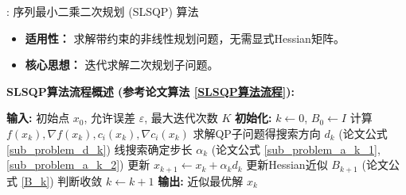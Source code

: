 \documentclass[9pt]{beamer}
\begin{document}
\begin{frame}{\insertsectionhead: 序列最小二乘二次规划 (SLSQP) 算法}
    \begin{itemize}
        \item \textbf{适用性：} 求解带约束的非线性规划问题，无需显式Hessian矩阵。
        \item \textbf{核心思想：} 迭代求解二次规划子问题。
    \end{itemize}
    \textbf{SLSQP算法流程概述 (参考论文算法 \ref{SLSQP算法流程}):}
    \begin{algorithmic}[1]
        \State \textbf{输入:} 初始点 $x_0$, 允许误差 $\varepsilon$, 最大迭代次数 $K$
        \State \textbf{初始化:} $k \leftarrow 0$, $B_0 \leftarrow I$
            \State 计算 $f(x_k), \nabla f(x_k), c_i(x_k), \nabla c_i(x_k)$
            \State 求解QP子问题得搜索方向 $d_k$ (论文公式 \ref{sub_problem_d_k})
            \State 线搜索确定步长 $\alpha_k$ (论文公式 \ref{sub_problem_a_k_1}, \ref{sub_problem_a_k_2})
            \State 更新 $x_{k+1} \leftarrow x_k + \alpha_k d_k$
            \State 更新Hessian近似 $B_{k+1}$ (论文公式 \ref{B_k})
            \State 判断收敛
            \State $k \leftarrow k + 1$
        \EndWhile
        \State \textbf{输出:} 近似最优解 $x_k$
    \end{algorithmic}
\end{frame}
\end{document}
